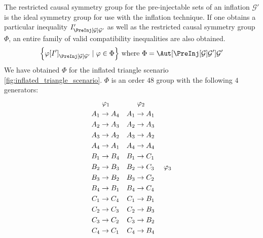 \documentclass[aps, 10pt, english, twoside, pra, nofootinbib, longbibliography]{revtex4-1}
\theoremstyle{plain}
\theoremstyle{definition}
\theoremstyle{remark}
\newcommand{\graph}{\mathcal{G}}
\newcommand{\gelem}{\varphi}
\newcommand{\action}[1]{\gelem\bs{#1}}
\begin{document}
    The restricted causal symmetry group for the pre-injectable sets of an inflation $\graph'$ is the ideal symmetry group for use with the inflation technique. If one obtains a particular inequality $I'_{\PreInj[\graph]{\graph'}}$ as well as the restricted causal symmetry group $\Phi$, an entire family of valid compatibility inequalities are also obtained.
    \[ \bc{\action{I'}_{\PreInj[\graph]{\graph'}} \mid \gelem \in \Phi} \text{ where } \Phi = \Aut[\PreInj[\graph]{\graph'}]{\graph'} \]
    We have obtained $\Phi$ for the inflated triangle scenario \cref{fig:inflated_triangle_scenario}. $\Phi$ is an order $48$ group with the following $4$ generators:
    \begin{equation*}
    \begin{aligned}[c]
    &\hspace{1mm}\gelem_1 \\
    A_1 &\to A_4 \\A_2 &\to A_3 \\A_3 &\to A_2 \\A_4 &\to A_1 \\B_1 &\to B_4 \\B_2 &\to B_3 \\B_3 &\to B_2 \\B_4 &\to B_1 \\C_1 &\to C_4 \\C_2 &\to C_3 \\C_3 &\to C_2 \\C_4 &\to C_1
    \end{aligned}
    \quad
    \begin{aligned}[c]
    &\hspace{1mm}\gelem_2 \\
    A_1 &\to A_1 \\A_2 &\to A_3 \\A_3 &\to A_2 \\A_4 &\to A_4 \\B_1 &\to C_1 \\B_2 &\to C_3 \\B_3 &\to C_2 \\B_4 &\to C_4 \\C_1 &\to B_1 \\C_2 &\to B_3 \\C_3 &\to B_2 \\C_4 &\to B_4
    \end{aligned}
    \quad
    \begin{aligned}[c]
    &\hspace{1mm}\gelem_3 \\

\end{aligned}
\end{equation*}
\end{document}
